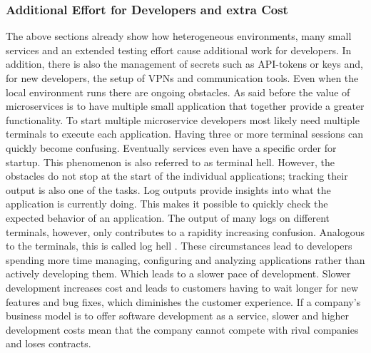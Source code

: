         \subsubsection{Additional Effort for Developers and extra Cost}
        The above sections already show how heterogeneous environments, many small services and an extended testing effort cause additional work for developers. In addition, there is also the management of secrets such as \ac{API}-tokens or keys and, for new developers, the setup of \ac{VPN}s and communication tools. Even when the local environment runs there are ongoing obstacles. As said before the value of microservices is to have multiple small application that together provide a greater functionality. To start multiple microservice developers most likely need multiple terminals to execute each application. Having three or more terminal sessions can quickly become confusing. Eventually services even have a specific order for startup. This phenomenon is also referred to as terminal hell. However, the obstacles do not stop at the start of the individual applications; tracking their output is also one of the tasks. Log outputs provide insights into what the application is currently doing. This makes it possible to quickly check the expected behavior of an application. The output of many logs on different terminals, however, only contributes to a rapidity increasing confusion. Analogous to the terminals, this is called log hell \cite{micro}.\newline
        These circumstances lead to developers spending more time managing, configuring and analyzing applications rather than actively developing them. Which leads to a slower pace of development. Slower development increases cost and leads to customers having to wait longer for new features and bug fixes, which diminishes the customer experience. If a company's business model is to offer software development as a service, slower and higher development costs mean that the company cannot compete with rival companies and loses contracts.

